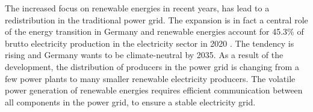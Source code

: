 The increased focus on renewable energies in recent years, has lead to a redistribution in the traditional power grid. The expansion is in fact a central role of the energy transition in Germany and renewable energies account for 45.3\% of brutto electricity production in the electricity sector in 2020 \cite{umwelt}. The tendency is rising and Germany wants to be climate-neutral by 2035.
As a result of the development, the distribution of producers in the power grid is changing from a few power plants to many smaller renewable electricity producers. The volatile power generation of renewable energies requires efficient communication between all components in the power grid, to ensure a stable electricity grid. \\
